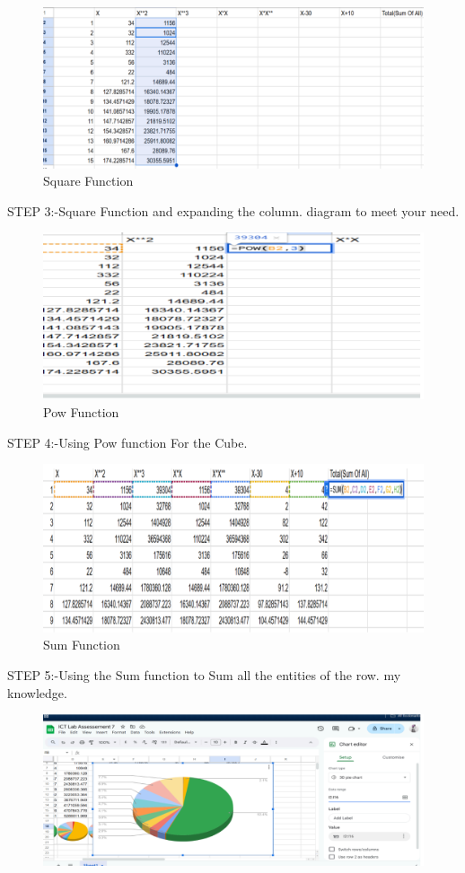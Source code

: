 \documentclass[a4paper,9pt]{article}
\begin{document}
\begin{enumerate}
	\begin{figure}[H]
		\centering
		\includegraphics[width=0.8\linewidth]{5.3.png}
		\caption{Square Function}
	\end{figure}
	STEP 3:-Square Function and expanding the column. diagram to meet your need.
	\begin{figure}[H]
		\centering
		\includegraphics[width=0.8\linewidth]{5.4.png}
		\caption{Pow Function}
	\end{figure}
	STEP 4:-Using Pow function For the Cube.
	\begin{figure}[H]
		\centering
		\includegraphics[width=0.8\linewidth]{5.7.png}
		\caption{Sum Function}
	\end{figure}
	STEP 5:-Using the Sum function to Sum all the entities of the row.
	my knowledge.
	\begin{figure}[H]
		\centering
		\includegraphics[width=0.8\linewidth]{5.6.png}

\end{figure}
\end{enumerate}
\end{document}
